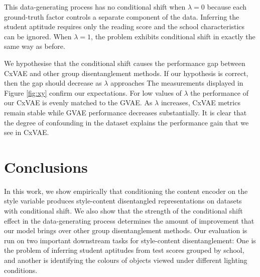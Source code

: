 \documentclass[../thesis.tex]{subfiles}
\begin{document}
This data-generating process has no conditional shift when $\lambda=0$ because each ground-truth factor controls a separate component of the data. Inferring the student aptitude requires only the reading score and the school characteristics can be ignored. When $\lambda=1$, the problem exhibits conditional shift in exactly the same way as before. 


We hypothesise that the conditional shift causes the performance gap between CxVAE and other group disentanglement methods. If our hypothesis is correct, then the gap should decrease as $\lambda$ approaches  The measurements displayed in Figure \ref{fig:xy} confirm our expectations. For low values of $\lambda$ the performance of our CxVAE is evenly matched to the GVAE.  As $\lambda$ increases, CxVAE metrics remain stable while GVAE performance decreases substantially.  It is clear that the degree of confounding in the dataset explains the performance gain that we see in CxVAE. 

\section{Conclusions}
\label{sec:conclusion}

In this work, we show empirically that conditioning the content encoder on the style variable produces style-content disentangled representations on datasets with conditional shift. We also show that the strength of the conditional shift effect in the data-generating process determines the amount of improvement that our model brings over other group disentanglement methods. Our evaluation is run on two important downstream tasks for style-content disentanglement: One is the problem of inferring student aptitudes from test scores grouped by school, and another is identifying the colours of objects viewed under different lighting conditions.


      

\biblio
\end{document}
